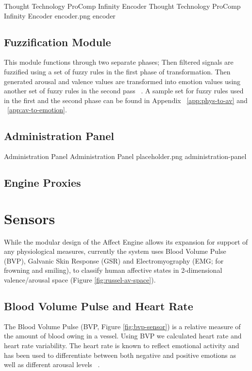 \img
{Thought Technology ProComp Infinity Encoder}
{Thought Technology ProComp Infinity Encoder}
{encoder.png}
{encoder}

\subsection{Fuzzification Module} \label{subsec:fuzzi} %
This module functions through two separate phases; Then filtered signals are fuzzified using a set of fuzzy rules in the first phase of transformation. Then generated arousal and valence values are transformed into emotion values using another set of fuzzy rules in the second pass ~\cite{mandryk2007fuzzy}. A sample set for fuzzy rules used in the first and the second phase can be found in Appendix ~\ref{app:phys-to-av} and ~\ref{app:av-to-emotion}.



\subsection{Administration Panel}

\img
{Administration Panel}
{Administration Panel}
{placeholder.png}
{administration-panel}

\subsection{Engine Proxies}


\section{Sensors}
While the modular design of the Affect Engine allows its expansion for support of any physiological measures, currently the system uses Blood Volume Pulse (BVP), Galvanic Skin Response (GSR) and Electromyography (EMG; for frowning and smiling), to classify human affective states in 2-dimensional valence/arousal space (Figure \ref{fig:russel-av-space}).

\subsection{Blood Volume Pulse and Heart Rate}
The Blood Volume Pulse (BVP, Figure \ref{fig:bvp-sensor}) is a relative measure of the amount of blood owing in a vessel. Using BVP we calculated heart rate and heart rate variability. The heart rate is known to reflect emotional activity and has been used to differentiate between both negative and positive emotions as well as different arousal levels ~\cite{tt2013procomp}.

